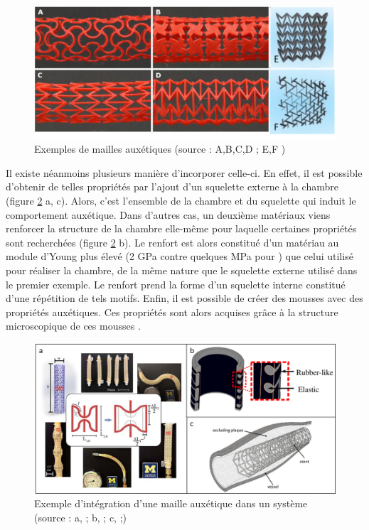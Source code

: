 \documentclass[10pt, a4paper]{article}
\begin{document}
\begin{figure}[ht!]
\centering
\includegraphics[scale=0.5]{ImageIntro/mailleAuxs.png}
\caption{ Exemples de mailles auxétiques (source : A,B,C,D \cite{Simons2019}; E,F \cite{AlvarezElipe2012})}
\label{fig:maillesAux}
\end{figure}
    
    Il existe néanmoins plusieurs manière d'incorporer celle-ci. En effet, il est possible d'obtenir de telles propriétés  par l'ajout d'un squelette externe à la chambre \cite{Sedal2018} \cite{Karnessis2013} (figure \ref{fig:Exemplescomposition} a, c). Alors, c'est l'ensemble de la chambre et du squelette qui induit le comportement auxétique. Dans d'autres cas, un deuxième matériaux viens renforcer la structure de la chambre elle-même pour laquelle certaines propriétés sont recherchées \cite{Pfeil2018} (figure \ref{fig:Exemplescomposition} b). Le renfort est alors constitué d'un matériau au module d'Young plus élevé (2 GPa contre quelques MPa pour \cite{Pfeil2018}) que celui utilisé pour réaliser la chambre, de la même nature que le squelette externe utilisé dans le premier exemple. Le renfort prend la forme d'un squelette interne constitué d'une répétition de tels motifs. Enfin, il est possible de créer des mousses avec des propriétés auxétiques. Ces propriétés sont alors acquises grâce à la structure microscopique de ces mousses \cite{Critchley2013}.
    
\begin{figure}[ht!]
\centering
\includegraphics[scale=0.5]{ImageIntro/StructuresAux.png}
\caption{ Exemple d'intégration d'une maille auxétique dans un système (source : a, \cite{Sedal2018}; b, \cite{Pfeil2018}; c, \cite{Karnessis2013};)}
\label{fig:Exemplescomposition}
\end{figure}
\end{document}
